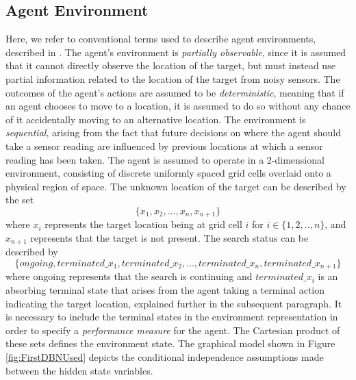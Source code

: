 \subsection{Agent Environment}
Here, we refer to conventional terms used to describe agent environments, described in \cite[p.~41]{AIAMA}. The agent's environment is \textit{partially observable}, since it is assumed that it cannot directly observe the location of the target, but must instead use partial information related to the location of the target from noisy sensors. The outcomes of the agent's actions are assumed to be \textit{deterministic}, meaning that if an agent chooses to move to a location, it is assumed to do so without any chance of it accidentally moving to an alternative location. The environment is \textit{sequential}, arising from the fact that future decisions on where the agent should take a sensor reading are influenced by previous locations at which a sensor reading has been taken. The agent is assumed to operate in a 2-dimensional environment, consisting of discrete uniformly spaced grid cells overlaid onto a physical region of space.
The unknown location of the target can be described by the set
\[\{x_1, x_2, ..., x_n, x_{n+1}\}\]
where $x_i$ represents the target location being at grid cell $i$ for $i \in \{1, 2, .., n\}$, and $x_{n+1}$ represents that the target is not present. The search status can be described by 
\[ \{ongoing, terminated\_x_1, terminated\_x_2, ..., terminated\_x_n, terminated\_x_{n+1}\} \]
where ongoing represents that the search is continuing and $terminated\_x_i$ is an absorbing terminal state that arises from the agent taking a terminal action indicating the target location, explained further in the subsequent paragraph. It is necessary to include the terminal states in the environment representation in order to specify a \textit{performance measure} for the agent. 
The Cartesian product of these sets defines the environment state. The graphical model shown in Figure \ref{fig:FirstDBNUsed} depicts the conditional independence assumptions made between the hidden state variables.
